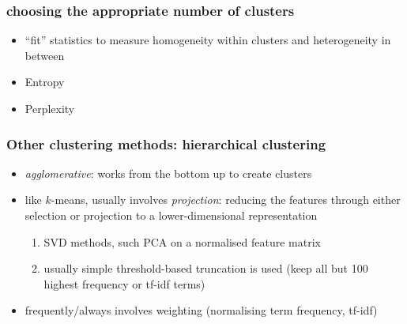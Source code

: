 \documentclass{beamer}
\begin{document}
\begin{frame}
	\frametitle{choosing the appropriate number of clusters}
	\begin{itemize}
		\item ``fit'' statistics to measure homogeneity within clusters and
		heterogeneity in between
		\item Entropy
		\item Perplexity
		\end{itemize}
	
\end{frame}

\begin{frame}
	\frametitle{Other clustering methods: hierarchical clustering}
	\begin{itemize}
		\item \emph{agglomerative}: works from the bottom up to create clusters
		\item \pause  like $k$-means, usually involves \emph{projection}: reducing
		the features through either selection or projection to a
		lower-dimensional representation
		\begin{enumerate}

			\item \pause SVD methods, such PCA on a normalised feature matrix
			\item usually simple threshold-based truncation is used \newline (keep all
			but 100 highest frequency or tf-idf terms)
		\end{enumerate}
		\item \pause frequently/always involves weighting (normalising term
		frequency, tf-idf)
	\end{itemize}
\end{frame}
\end{document}
